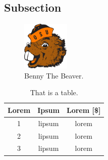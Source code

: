 
\lipsum[2-5] 

\subsection{Subsection}
\lipsum[5]

\begin{figure}[H]
    \centering
    \includegraphics[width = 0.2\textwidth ]{figures/tex.png}
    \caption{Benny The Beaver.} 
    \label{fig:bennyb}
\end{figure}

\lipsum[6-7]

\begin{table}[H]
    \centering
    \caption{That is a table.}
    \begin{tabular}{|c|c|c|}
    \centering
    \textbf{Lorem} & \textbf{Ipsum} & \textbf{Lorem [\$]} \\ \hline \hline
1   & lipsum    & lorem     \\ \hline   
2   & lipsum    & lorem   \\ \hline
3   & lipsum    & lorem  
    \end{tabular}
    \label{tab:table1}
\end{table}

\lipsum[8]
